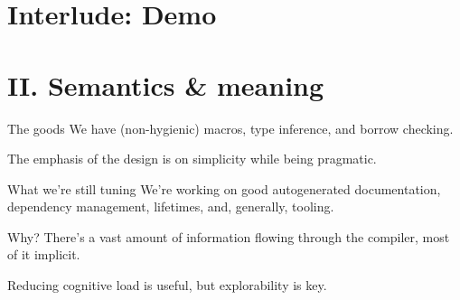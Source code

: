 \documentclass[aspectratio=169]{beamer}
\begin{document}
  \section{Interlude: Demo}
  \section{II. Semantics \& meaning}
  \begin{frame}{The goods}
    We have (non-hygienic) macros, type inference, and borrow checking.
    \linebreak

    The emphasis of the design is on simplicity while being pragmatic.
  \end{frame}
  \begin{frame}{What we’re still tuning}
    We’re working on good autogenerated documentation, dependency management,
    lifetimes, and, generally, tooling.
  \end{frame}
  \begin{frame}{Why?}
    There’s a vast amount of information flowing through the compiler, most
    of it implicit. \linebreak

    Reducing cognitive load is useful, but explorability is key.
  \end{frame}
\end{document}
